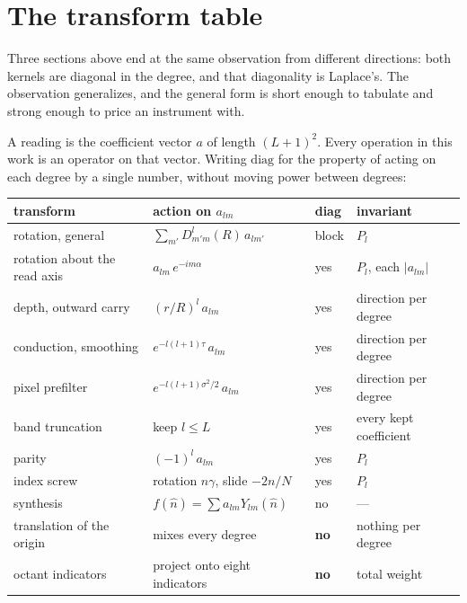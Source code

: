\section{The transform table}
\label{sec:transforms}

Three sections above end at the same observation from different directions: both kernels are diagonal in the degree, and that diagonality is Laplace's. The observation generalizes, and the general form is short enough to tabulate and strong enough to price an instrument with.

A reading is the coefficient vector \(a\) of length \((L+1)^2\). Every operation in this work is an operator on that vector. Writing \(\mathrm{diag}\) for the property of acting on each degree by a single number, without moving power between degrees:

\begin{center}
\begin{tabular}{llll}
\toprule
transform & action on \(a_{lm}\) & diag & invariant \\
\midrule
rotation, general & \(\sum_{m'} D^{l}_{m'm}(R)\, a_{lm'}\) & block & \(P_l\) \\
rotation about the read axis & \(a_{lm}\, e^{-im\alpha}\) & yes & \(P_l\), each \(|a_{lm}|\) \\
depth, outward carry & \((r/R)^{l}\, a_{lm}\) & yes & direction per degree \\
conduction, smoothing & \(e^{-l(l+1)\tau}\, a_{lm}\) & yes & direction per degree \\
pixel prefilter & \(e^{-l(l+1)\sigma^2/2}\, a_{lm}\) & yes & direction per degree \\
band truncation & keep \(l \le L\) & yes & every kept coefficient \\
parity & \((-1)^{l}\, a_{lm}\) & yes & \(P_l\) \\
index screw & rotation \(n\gamma\), slide \(-2n/N\) & yes & \(P_l\) \\
synthesis & \(f(\hat n) = \sum a_{lm} Y_{lm}(\hat n)\) & no & --- \\
translation of the origin & mixes every degree & \textbf{no} & nothing per degree \\
octant indicators & project onto eight indicators & \textbf{no} & total weight \\
\bottomrule
\end{tabular}
\end{center}

